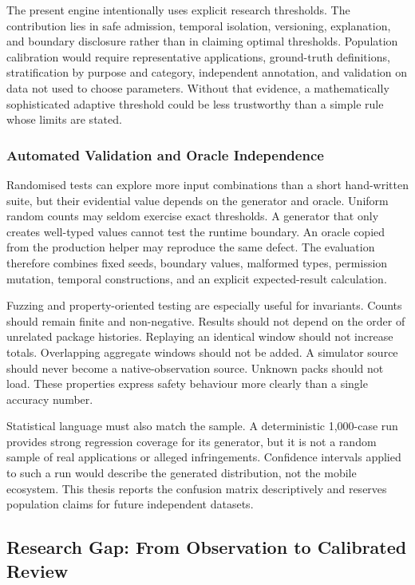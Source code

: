 The present engine intentionally uses explicit research thresholds. The contribution lies in safe admission, temporal isolation, versioning, explanation, and boundary disclosure rather than in claiming optimal thresholds. Population calibration would require representative applications, ground-truth definitions, stratification by purpose and category, independent annotation, and validation on data not used to choose parameters. Without that evidence, a mathematically sophisticated adaptive threshold could be less trustworthy than a simple rule whose limits are stated.

\subsubsection{Automated Validation and Oracle Independence}

Randomised tests can explore more input combinations than a short hand-written suite, but their evidential value depends on the generator and oracle. Uniform random counts may seldom exercise exact thresholds. A generator that only creates well-typed values cannot test the runtime boundary. An oracle copied from the production helper may reproduce the same defect. The evaluation therefore combines fixed seeds, boundary values, malformed types, permission mutation, temporal constructions, and an explicit expected-result calculation.

Fuzzing and property-oriented testing are especially useful for invariants. Counts should remain finite and non-negative. Results should not depend on the order of unrelated package histories. Replaying an identical window should not increase totals. Overlapping aggregate windows should not be added. A simulator source should never become a native-observation source. Unknown packs should not load. These properties express safety behaviour more clearly than a single accuracy number.

Statistical language must also match the sample. A deterministic 1,000-case run provides strong regression coverage for its generator, but it is not a random sample of real applications or alleged infringements. Confidence intervals applied to such a run would describe the generated distribution, not the mobile ecosystem. This thesis reports the confusion matrix descriptively and reserves population claims for future independent datasets.

\subsection{Research Gap: From Observation to Calibrated Review}

